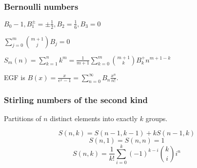 \subsubsection{Bernoulli numbers}

$B_0-1,B_1^{\pm}=\pm\frac{1}{2},B_2=\frac{1}{6},B_3=0$

$\displaystyle\sum_{j=0}^m\binom{m+1}{j}B_j=0$

$S_m(n)=\displaystyle\sum_{k=1}^nk^m=\frac{1}{m+1}\sum_{k=0}^m\binom{m+1}{k}B^{+}_kn^{m+1-k}$

EGF is $B(x) = \frac{x}{e^x - 1}=\displaystyle\sum_{n=0}^\infty B_n\frac{x^n}{n!}$.

\subsubsection{Stirling numbers of the second kind}
Partitions of $n$ distinct elements into exactly $k$ groups. 

\[ S(n, k) = S(n - 1, k - 1) + kS(n - 1, k) \]
\[ S(n, 1) = S(n, n) = 1 \]
\[ S(n, k) = \frac{1}{k!}\sum_{i=0}^{k}(-1)^{k-i}{k \choose i}i^n \]
